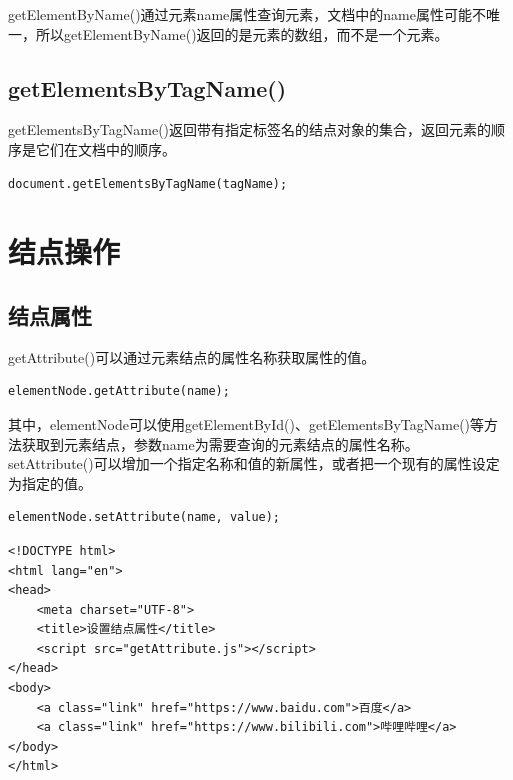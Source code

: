 getElementByName()通过元素name属性查询元素，文档中的name属性可能不唯一，所以getElementByName()返回的是元素的数组，而不是一个元素。\\

\subsection{getElementsByTagName()}

getElementsByTagName()返回带有指定标签名的结点对象的集合，返回元素的顺序是它们在文档中的顺序。\\

\begin{lstlisting}[style=htmlcssjs]
document.getElementsByTagName(tagName);
\end{lstlisting}

\newpage

\section{结点操作}

\subsection{结点属性}

getAttribute()可以通过元素结点的属性名称获取属性的值。\\

\begin{lstlisting}[style=htmlcssjs]
elementNode.getAttribute(name);
\end{lstlisting}

其中，elementNode可以使用getElementById()、getElementsByTagName()等方法获取到元素结点，参数name为需要查询的元素结点的属性名称。\\

setAttribute()可以增加一个指定名称和值的新属性，或者把一个现有的属性设定为指定的值。\\

\begin{lstlisting}[style=htmlcssjs]
elementNode.setAttribute(name, value);
\end{lstlisting}

\vspace{0.5cm}


\begin{lstlisting}[style=htmlcssjs, title=getAttribute.html]
<!DOCTYPE html>
<html lang="en">
<head>
    <meta charset="UTF-8">
    <title>设置结点属性</title>
    <script src="getAttribute.js"></script>
</head>
<body>
    <a class="link" href="https://www.baidu.com">百度</a>
    <a class="link" href="https://www.bilibili.com">哔哩哔哩</a>
</body>
</html>
\end{lstlisting}

